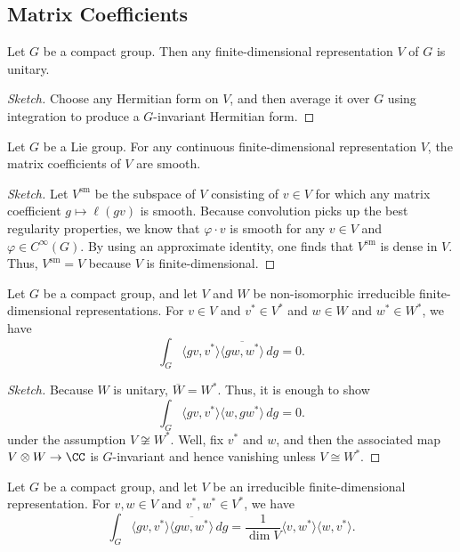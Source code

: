 \documentclass{article}
\begin{document}
\subsection{Matrix Coefficients}
\begin{proposition}
	Let $G$ be a compact group. Then any finite-dimensional representation $V$ of $G$ is unitary.
\end{proposition}
\begin{proof}[Sketch]
	Choose any Hermitian form on $V$, and then average it over $G$ using integration to produce a $G$-invariant Hermitian form.
\end{proof}
\begin{proposition}
	Let $G$ be a Lie group. For any continuous finite-dimensional representation $V$, the matrix coefficients of $V$ are smooth.
\end{proposition}
\begin{proof}[Sketch]
	Let $V^{\mathrm{sm}}$ be the subspace of $V$ consisting of $v\in V$ for which any matrix coefficient $g\mapsto\ell(gv)$ is smooth. Because convolution picks up the best regularity properties, we know that $\varphi\cdot v$ is smooth for any $v\in V$ and $\varphi\in C^\infty(G)$. By using an approximate identity, one finds that $V^{\mathrm{sm}}$ is dense in $V$. Thus, $V^{\mathrm{sm}}=V$ because $V$ is finite-dimensional.
\end{proof}
\begin{proposition}[Orthogonality]
	Let $G$ be a compact group, and let $V$ and $W$ be non-isomorphic irreducible finite-dimen\-sional representations. For $v\in V$ and $v^*\in V^*$ and $w\in W$ and $w^*\in W^*$, we have
	\[\int_G\langle gv,v^*\rangle\overline{\langle gw,w^*\rangle}\,dg=0.\]
\end{proposition}
\begin{proof}[Sketch]
	Because $W$ is unitary, $\overline W=W^*$. Thus, it is enough to show
	\[\int_G\langle gv,v^*\rangle\langle w,gw^*\rangle\,dg=0.\]
	under the assumption $V\not\cong W^*$. Well, fix $v^*$ and $w$, and then the associated map $V\otimes W\to\CC$ is $G$-invariant and hence vanishing unless $V\cong W^*$.
\end{proof}
\begin{proposition}[Orthogonality]
	Let $G$ be a compact group, and let $V$ be an irreducible finite-dimensional representation. For $v,w\in V$ and $v^*,w^*\in V^*$, we have
	\[\int_G\langle gv,v^*\rangle\overline{\langle gw,w^*\rangle}\,dg=\frac1{\dim V}\langle v,w^*\rangle\langle w,v^*\rangle.\]
\end{proposition}
\end{document}
